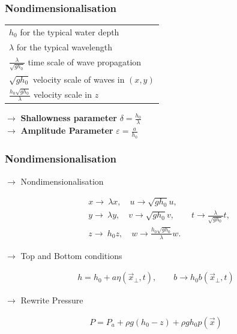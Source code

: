 \documentclass[fleqn]{beamer}
\newcommand{\tabitem}{%
  \usebeamertemplate{itemize item}\hspace*{\labelsep}}
\begin{document}
    \begin{frame}
        \frametitle{Nondimensionalisation}
        \begin{center}
        \begin{tabular}{@{}l@{}}
                \tabitem $h_0$ for the typical water depth\\
                \tabitem $\lambda$ for the typical wavelength\\
                \tabitem $\frac{\lambda}{\sqrt{g h_0}}$ time scale
                of wave propagation\\
                \tabitem $\sqrt{g h_0}$ velocity scale of waves in
                $(x, y)$\\
                \tabitem $\frac{h_0 \sqrt{g h_0} }{\lambda}$ velocity scale in $z$
        \end{tabular}
        \end{center}
        \centering
        $\rightarrow$ \textbf{Shallowness parameter} $\delta =
        \frac{h_0}{\lambda}$
        \\
        \centering
        $\rightarrow$ \textbf{Amplitude Parameter}
        $\varepsilon=\frac{a}{h_0}$
    \end{frame}

    \begin{frame}
        \frametitle{Nondimensionalisation}
        $\rightarrow$ Nondimensionalisation
        \begin{ceqn}
        \begin{align}
            &x \rightarrow\ \lambda x, \quad u \rightarrow \sqrt{gh_0} u,
            \nonumber \\
              &y \rightarrow\ \lambda y, \quad v \rightarrow \sqrt{gh_0} v, \qquad
              t\rightarrow \frac{\lambda}{\sqrt{gh_0}}t,\nonumber\\
              &z \rightarrow\ h_0 z, \quad w \rightarrow
            \frac{h_0\sqrt{gh_0}}{\lambda} w.\nonumber
        \end{align}
        \end{ceqn}
        \centering
        $\rightarrow$ Top and Bottom conditions
        \begin{ceqn}
        \begin{align}
        h = h_0 + a \eta(\vec{x}_\perp,t), \qquad  b \rightarrow h_0
        b(\vec{x}_\perp, t)\nonumber
        \end{align}
        \end{ceqn}
        \centering
        $\rightarrow$ Rewrite Pressure
        \begin{ceqn}
        \begin{align}
            P = P_a + \rho g(h_0 -z) + \rho g h_0 p(\vec{x})  \nonumber
        \end{align}
        \end{ceqn}
    \end{frame}
\end{document}
